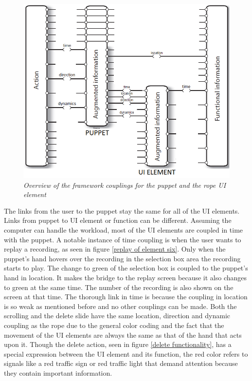 \begin{figure}[H]
	\begin{center}
		\includegraphics[width=14cm]{figures/standard_framework_Rope.png}
		\caption{\emph{Overview of the framework couplings for the puppet and the rope UI element}}
		\label{puppet_rope_framework}
	\end{center}
\end{figure}

\newpage

The links from the user to the puppet stay the same for all of the UI elements. Links from puppet to UI element or function can be different. Assuming the computer can handle the workload, most of the UI elements are coupled in time with the puppet. A notable instance of time coupling is when the user wants to replay a recording, as seen in figure \ref{replay of element six}. Only when the puppet's hand hovers over the recording in the selection box area the recording starts to play. The change to green of the selection box is coupled to the puppet's hand in location. It makes the bridge to the replay screen because it also changes to green at the same time. The number of the recording is also shown on the screen at that time. The thorough link in time is because the coupling in location is so weak as mentioned before and no other couplings can be made. Both the scrolling and the delete slide have the same location, direction and dynamic coupling as the rope due to the general color coding and the fact that the movement of the UI elements are always the same as that of the hand that acts upon it. Though the delete action, seen in figure \ref{delete functionality}, has a special expression between the UI element and its function, the red color refers to signals like a red traffic sign or red traffic light that demand attention because they contain important information. 

